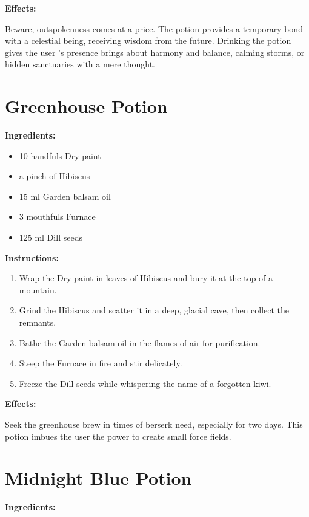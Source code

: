 \documentclass{article}
\begin{document}
\textbf{Effects:}

Beware, outspokenness comes at a price. The potion provides a temporary bond with a celestial being, receiving wisdom from the future. Drinking the potion gives the user 's presence brings about harmony and balance, calming storms, or hidden sanctuaries with a mere thought.

\newpage
\section*{Greenhouse Potion}

\textbf{Ingredients:}

\begin{itemize}
  \item 10 handfuls Dry paint
  \item a pinch of Hibiscus
  \item 15 ml Garden balsam oil
  \item 3 mouthfuls Furnace
  \item 125 ml Dill seeds
\end{itemize}

\textbf{Instructions:}

\begin{enumerate}
  \item Wrap the Dry paint in leaves of Hibiscus and bury it at the top of a mountain.
  \item Grind the Hibiscus and scatter it in a deep, glacial cave, then collect the remnants.
  \item Bathe the Garden balsam oil in the flames of air for purification.
  \item Steep the Furnace in fire and stir delicately.
  \item Freeze the Dill seeds while whispering the name of a forgotten kiwi.
\end{enumerate}

\textbf{Effects:}

Seek the greenhouse brew in times of berserk need, especially for two days. This potion imbues the user the power to create small force fields.

\newpage
\section*{Midnight Blue Potion}

\textbf{Ingredients:}
\end{document}
